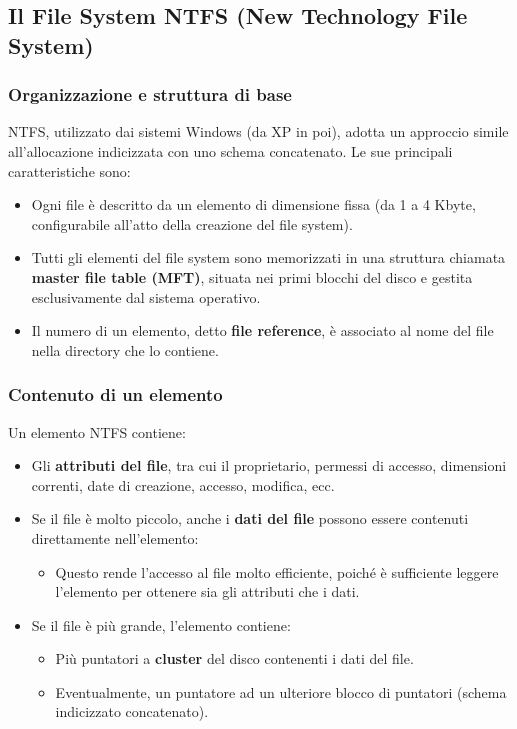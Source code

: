 \subsection{Il File System NTFS (New Technology File System)}
\subsubsection{Organizzazione e struttura di base}
NTFS, utilizzato dai sistemi Windows (da XP in poi), adotta un approccio simile all'allocazione indicizzata con uno schema concatenato. Le sue principali caratteristiche sono:
\begin{itemize}
    \item Ogni file è descritto da un elemento di dimensione fissa (da 1 a 4 Kbyte, configurabile all’atto della creazione del file system).
    \item Tutti gli elementi del file system sono memorizzati in una struttura chiamata \textbf{master file table (MFT)}, situata nei primi blocchi del disco e gestita esclusivamente dal sistema operativo.
    \item Il numero di un elemento, detto \textbf{file reference}, è associato al nome del file nella directory che lo contiene.
\end{itemize}

\subsubsection{Contenuto di un elemento}
Un elemento NTFS contiene:
\begin{itemize}
    \item Gli \textbf{attributi del file}, tra cui il proprietario, permessi di accesso, dimensioni correnti, date di creazione, accesso, modifica, ecc.
    \item Se il file è molto piccolo, anche i \textbf{dati del file} possono essere contenuti direttamente nell’elemento:
    \begin{itemize}
        \item Questo rende l’accesso al file molto efficiente, poiché è sufficiente leggere l’elemento per ottenere sia gli attributi che i dati.
    \end{itemize}
    \item Se il file è più grande, l’elemento contiene:
    \begin{itemize}
        \item Più puntatori a \textbf{cluster} del disco contenenti i dati del file.
        \item Eventualmente, un puntatore ad un ulteriore blocco di puntatori (schema indicizzato concatenato).
    \end{itemize}
\end{itemize}

